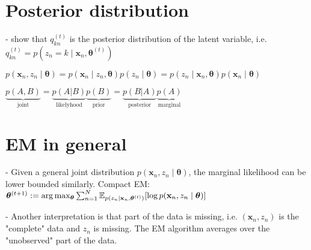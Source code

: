 \section*{Posterior distribution}
- show that $q_{k n}^{(t)}$ is the posterior distribution of the latent variable, i.e. $q_{k n}^{(t)}=p\left(z_{n}=k \mid \mathbf{x}_{n}, \boldsymbol{\theta}^{(t)}\right)$

$p\left(\mathbf{x}_{n}, z_{n} \mid \boldsymbol{\theta}\right)=p\left(\mathbf{x}_{n} \mid z_{n}, \boldsymbol{\theta}\right) p\left(z_{n} \mid \boldsymbol{\theta}\right)=p\left(z_{n} \mid \mathbf{x}_{n}, \boldsymbol{\theta}\right) p\left(\mathbf{x}_{n} \mid \boldsymbol{\theta}\right)$

$\underbrace{p(A,B)}_{\text{joint}}=\underbrace{p(A|B)}_{\text{likelyhood}}\underbrace{p(B)}_{\text{prior}}=\underbrace{p(B|A)}_{\text{posterior}}\underbrace{p(A)}_{\text{marginal}}$

\section*{EM in general}
- Given a general joint distribution $p\left(\mathbf{x}_{n}, z_{n} \mid \boldsymbol{\theta}\right)$, the marginal likelihood can be lower bounded similarly. Compact EM:
$\boldsymbol{\theta}^{(t+1)} \\:= \arg \max_{\boldsymbol{\theta}} \sum_{n=1}^{N} \mathbb{E}_{p(z_{n} \mid \mathbf{x}_{n}, \boldsymbol{\theta}^{(t)})}[\log p(\mathbf{x}_{n}, z_{n} \mid \boldsymbol{\theta})]$

- Another interpretation is that part of the data is missing, i.e. $\left(\mathbf{x}_{n}, z_{n}\right)$ is the "complete" data and $z_{n}$ is missing. The EM algorithm averages over the "unobserved" part of the data.